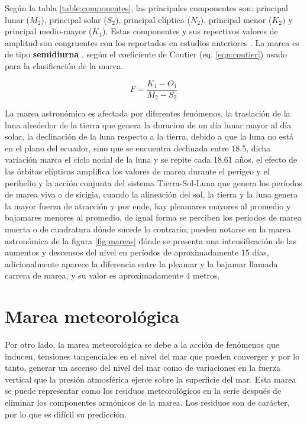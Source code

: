Según la tabla \ref{table:componentes}, las principales componentes son: principal lunar ($M_{2}$), principal solar ($S_{2}$), principal elíptica ($N_{2}$), principal menor ($K_{2})$ y principal medio-mayor ($K_{1}$). Estas componentes y sus repectivos valores de amplitud son congruentes con los reportados en estudios anteriores \citep{Malikov2010}. La marea es de tipo \textbf{semidiurna} \citep{MolaresBabra2004}, según el coeficiente de Coutier (eq. \ref{eqn:coutier}) usado para la clasificación de la marea.

\begin{equation}
F=\frac{ K_{1}-O_{1}}{M_{2}-S_{2}}
\label{eqn:coutier}
\end{equation}

La marea astronómica es afectada por diferentes fenómenos, la traslación de la luna alrededor de la tierra que genera la duracion de un día lunar mayor al día solar, la declinación de la luna respecto a la tierra, debido a que la luna no está en el plano del ecuador, sino que se encuentra declinada entre 18.5\textdegree, dicha variación marca el ciclo nodal de la luna y se repite cada 18.61 años, el efecto de las órbitas elípticas amplifica los valores de marea durante el perigeo y el perihelio y la acción conjunta del sistema Tierra-Sol-Luna que genera los períodos de marea viva o de sicigia, cuando la alineación del sol, la tierra y la luna genera la mayor fuerza de atracción y por ende, hay pleamares mayores al promedio y bajamares menores al promedio, de igual forma se perciben los períodos de marea muerta o de cuadratura dónde sucede lo contrario; pueden notarse en la marea astronómica de la figura \ref{fig:mareas} dónde se presenta una intensificación de las aumentos y descensos del nivel en períodos de aproximadamente 15 días, adicionalmente aparece la diferencia entre la pleamar y la bajamar llamada carrera de marea, y su valor es aproximadamente 4 metros.

\section{Marea meteorológica}

Por otro lado, la marea meteorológica se debe a la acción de fenómenos que inducen, tensiones tangenciales en el nivel del mar que pueden converger y por lo tanto, generar un ascenso del nivel del mar como de variaciones en la fuerza vertical que la presión atmosférica ejerce sobre la superficie del mar. Esta marea se puede representar como los residuos meteorológicos en la serie después de eliminar los componentes armónicos de la marea. Los residuos son de carácter, por lo que es difícil su predicción.

